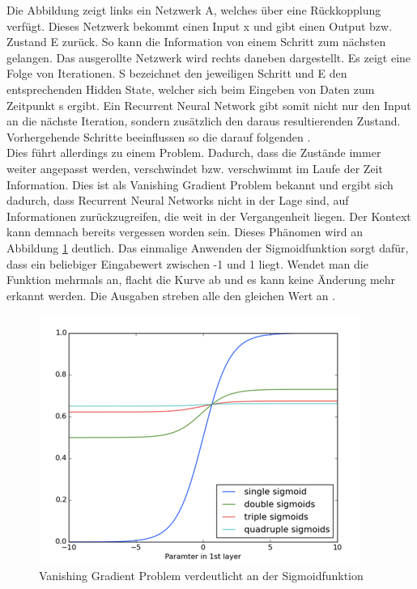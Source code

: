 Die Abbildung zeigt links ein Netzwerk A, welches über eine Rückkopplung verfügt. Dieses Netzwerk bekommt einen Input x und gibt einen Output bzw. Zustand E zurück. So kann die Information von einem Schritt zum nächsten gelangen. Das ausgerollte Netzwerk wird rechts daneben dargestellt. Es zeigt eine Folge von Iterationen. S bezeichnet den jeweiligen Schritt und E den entsprechenden Hidden State, welcher sich beim Eingeben von Daten zum Zeitpunkt s ergibt. Ein Recurrent Neural Network gibt somit nicht nur den Input an die nächste Iteration, sondern zusätzlich den daraus resultierenden Zustand. Vorhergehende Schritte beeinflussen so die darauf folgenden {\cite{Yu.2014}}. 
\\
Dies führt allerdings zu einem Problem. Dadurch, dass die Zustände immer weiter angepasst werden, verschwindet bzw. verschwimmt im Laufe der Zeit Information. Dies ist als Vanishing Gradient Problem bekannt und ergibt sich dadurch, dass Recurrent Neural Networks nicht in der Lage sind, auf Informationen zurückzugreifen, die weit in der Vergangenheit liegen. Der Kontext kann demnach bereits vergessen worden sein. Dieses Phänomen wird an Abbildung \ref{fig:vanishing} deutlich. Das einmalige Anwenden der Sigmoidfunktion sorgt dafür, dass ein beliebiger Eingabewert zwischen -1 und 1 liegt. Wendet man die Funktion mehrmals an, flacht die Kurve ab und es kann keine Änderung mehr erkannt werden. Die Ausgaben streben alle den gleichen Wert an {\cite{deeplearning4j}}.

\begin{figure}[h!]
	\centering
	\includegraphics[width=0.9\linewidth]{images/vanishing_gradient}
	\caption{Vanishing Gradient Problem verdeutlicht an der Sigmoidfunktion \cite{deeplearning4j}} %
	\label{fig:vanishing}
\end{figure} 

